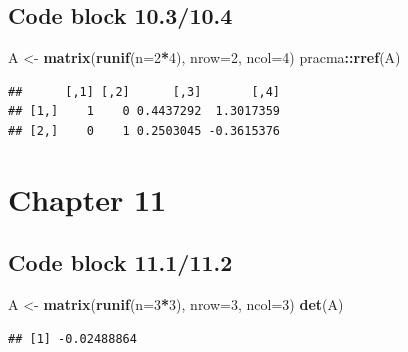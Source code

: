 \documentclass[
]{book}
\newenvironment{Shaded}{\begin{snugshade}}{\end{snugshade}}
\newcommand{\DataTypeTok}[1]{\textcolor[rgb]{0.13,0.29,0.53}{#1}}
\newcommand{\DecValTok}[1]{\textcolor[rgb]{0.00,0.00,0.81}{#1}}
\newcommand{\KeywordTok}[1]{\textcolor[rgb]{0.13,0.29,0.53}{\textbf{#1}}}
\newcommand{\NormalTok}[1]{#1}
\newcommand{\OperatorTok}[1]{\textcolor[rgb]{0.81,0.36,0.00}{\textbf{#1}}}
\newcommand{\StringTok}[1]{\textcolor[rgb]{0.31,0.60,0.02}{#1}}
\begin{document}
\hypertarget{code-block-10.310.4}{%
\subsection*{Code block 10.3/10.4}\label{code-block-10.310.4}}

\begin{Shaded}
\begin{Highlighting}[]
\NormalTok{A \textless{}{-}}\StringTok{ }\KeywordTok{matrix}\NormalTok{(}\KeywordTok{runif}\NormalTok{(}\DataTypeTok{n=}\DecValTok{2}\OperatorTok{*}\DecValTok{4}\NormalTok{), }\DataTypeTok{nrow=}\DecValTok{2}\NormalTok{, }\DataTypeTok{ncol=}\DecValTok{4}\NormalTok{)}
\NormalTok{pracma}\OperatorTok{::}\KeywordTok{rref}\NormalTok{(A)}
\end{Highlighting}
\end{Shaded}

\begin{verbatim}
##      [,1] [,2]      [,3]       [,4]
## [1,]    1    0 0.4437292  1.3017359
## [2,]    0    1 0.2503045 -0.3615376
\end{verbatim}

\hypertarget{chapter-11}{%
\section*{Chapter 11}\label{chapter-11}}

\hypertarget{code-block-11.111.2}{%
\subsection*{Code block 11.1/11.2}\label{code-block-11.111.2}}

\begin{Shaded}
\begin{Highlighting}[]
\NormalTok{A \textless{}{-}}\StringTok{ }\KeywordTok{matrix}\NormalTok{(}\KeywordTok{runif}\NormalTok{(}\DataTypeTok{n=}\DecValTok{3}\OperatorTok{*}\DecValTok{3}\NormalTok{), }\DataTypeTok{nrow=}\DecValTok{3}\NormalTok{, }\DataTypeTok{ncol=}\DecValTok{3}\NormalTok{)}
\KeywordTok{det}\NormalTok{(A)}
\end{Highlighting}
\end{Shaded}

\begin{verbatim}
## [1] -0.02488864
\end{verbatim}
\end{document}
